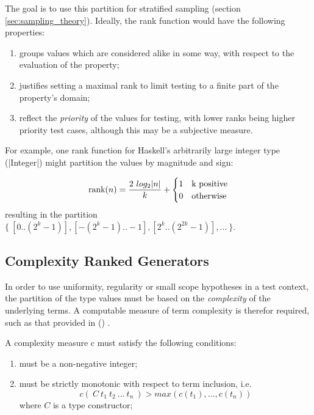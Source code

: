 \noindent
The goal is to use this partition for stratified sampling (section \ref{sec:sampling_theory}).
Ideally, the rank function would have the following properties:

\begin{enumerate}
\item groups values which are considered alike in some way, 
with respect to the evaluation of the property;
\item justifies setting a maximal rank to limit testing to a finite part of the property's domain;
\item reflect the \emph{priority} of the values for testing,
with lower ranks being higher priority test cases,
although this may be a subjective measure.
\end{enumerate}
\noindent
For example,
one rank function for Haskell's arbitrarily large integer type (|Integer|)
might partition the values by magnitude and sign:

\begin{equation*}
\text{rank}(n) = \frac{2\ log_2 \lvert n\rvert}{ k } + \begin{cases} 1 & \text{k positive} \\ 0 & \text{otherwise}\end{cases}
\end{equation*}
\noindent
resulting in the partition $\{\ [0..(2^{k} - 1)], [-(2^{k} - 1)..-1], [2^{k} .. (2^{2k} - 1)], \ldots\ \}$.

\subsection{Complexity Ranked Generators}
In order to use uniformity, regularity or small scope hypotheses in a test context,
the partition of the type values must be based on the \emph{complexity} of the underlying terms.
A computable measure of term complexity is therefor required,
such as that provided in  (\cite{BernotGaudelMarre1991}) .

\begin{df}
A  complexity measure c must satisfy the following conditions:

\begin{enumerate}
\item must be a non-negative integer;
\item must be strictly monotonic with respect to term inclusion, i.e.
$$ c(\ C\ t_1\ t_2\ ...\ t_n\ ) > max( c(t_1), ..., c(t_n) ) $$ 
where $C$ is a type constructor;
\end{enumerate}

\end{df}

